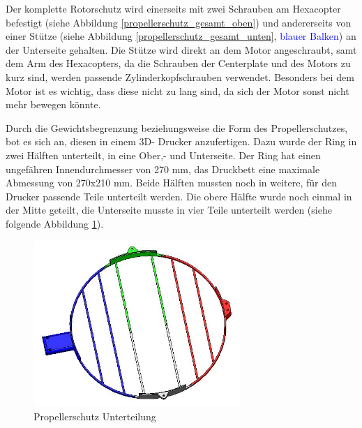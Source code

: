 	Der komplette Rotorschutz wird einerseits mit zwei Schrauben am Hexacopter befestigt (siehe Abbildung \ref{propellerschutz_gesamt_oben}) und andererseits von einer Stütze (siehe Abbildung  \ref{propellerschutz_gesamt_unten},
	\textcolor{blue}{blauer Balken}) an der Unterseite gehalten.
	Die Stütze wird direkt an dem Motor angeschraubt, samt dem Arm des Hexacopters, da die Schrauben der Centerplate und des Motors zu kurz sind, werden passende Zylinderkopfschrauben verwendet.
	Besonders bei dem Motor ist es wichtig, dass diese nicht zu lang sind, da sich der Motor sonst nicht mehr bewegen könnte.

	Durch die Gewichtsbegrenzung beziehungsweise die Form des Propellerschutzes, bot es sich an, diesen in einem 3D- Drucker anzufertigen.
	Dazu wurde der Ring in zwei Hälften unterteilt, in eine Ober,- und Unterseite.
	Der Ring hat einen ungefähren Innendurchmesser von 270 mm, das Druckbett eine maximale Abmessung von 270x210 mm.
	Beide Hälften mussten noch in weitere, für den Drucker passende Teile unterteilt werden.
	Die obere Hälfte wurde noch einmal in der Mitte geteilt, die Unterseite musste in vier Teile unterteilt werden (siehe folgende Abbildung \ref{propellerschutz_mitte_unterteilung}).

			\begin{figure}[tbh]
			\begin{centering}
			\includegraphics[width = 0.7\textwidth]{Bilder/propellerschutz_mitte_unterteilung}
			\par\end{centering}
			\caption{Propellerschutz Unterteilung}
			\label{propellerschutz_mitte_unterteilung}
			\end{figure}

